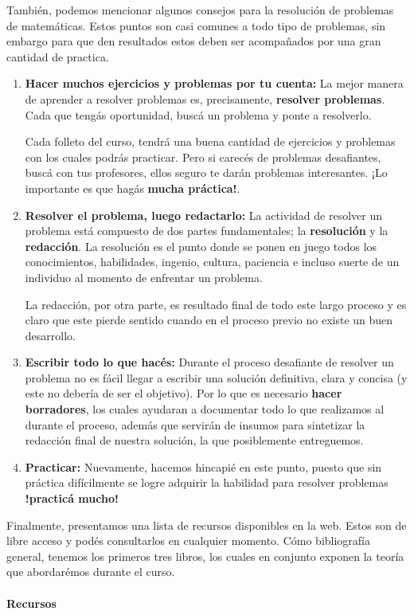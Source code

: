 También, podemos mencionar algunos consejos para la resolución de problemas de matemáticas.
Estos puntos son casi comunes a todo tipo de problemas, sin embargo para que den resultados estos deben ser acompañados por una gran cantidad de practica.

\begin{enumerate}
    \item \textbf{Hacer muchos ejercicios y problemas por tu cuenta:} La mejor manera de aprender a resolver problemas es, precisamente, \textbf{resolver problemas}.
    Cada que tengás oportunidad, buscá un problema y ponte a resolverlo.

    Cada folleto del curso, tendrá una buena cantidad de ejercicios y problemas con los cuales podrás practicar.
    Pero si carecés de problemas desafiantes, buscá con tus profesores, ellos seguro te darán problemas interesantes.
    ¡Lo importante es que hagás \textbf{mucha práctica!}.
    \item \textbf{Resolver el problema, luego redactarlo:} La actividad de resolver un problema está compuesto de dos partes fundamentales; la \textbf{resolución} y la \textbf{redacción}.
    La resolución es el punto donde se ponen en juego todos los conocimientos, habilidades, ingenio, cultura, paciencia e incluso suerte de un individuo al momento de enfrentar un problema.

    La redacción, por otra parte, es resultado final de todo este largo proceso y es claro que este pierde sentido cuando en el proceso previo no existe un buen desarrollo.
    \item \textbf{Escribir todo lo que hacés:} Durante el proceso desafiante de resolver un problema no es fácil llegar a escribir una solución definitiva, clara y concisa (y este no debería de ser el objetivo).
    Por lo que es necesario \textbf{hacer borradores}, los cuales ayudaran a documentar todo lo que realizamos al durante el proceso, además que servirán de insumos para sintetizar la redacción final de nuestra solución, la que posiblemente entreguemos.
    \item \textbf{Practicar:} Nuevamente, hacemos hincapié en este punto, puesto que sin práctica difícilmente se logre adquirir la habilidad para resolver problemas \textbf{!practicá mucho!}
\end{enumerate}


Finalmente, presentamos una lista de recursos disponibles en la web.
Estos son de libre acceso y podés consultarlos en cualquier momento.
Cómo bibliografía general, tenemos los primeros tres libros, los cuales en conjunto exponen la teoría que abordarémos durante el curso.\\
\vspace{2mm}\\
\textbf{\large Recursos}

